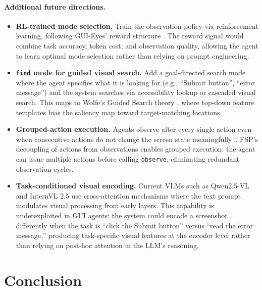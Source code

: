 \documentclass[11pt,a4paper]{article}
\begin{document}
\paragraph{Additional future directions.}

\begin{itemize}
    \item \textbf{RL-trained mode selection.} Train the observation policy via reinforcement learning, following GUI-Eyes' reward structure \cite{gui-eyes}. The reward signal would combine task accuracy, token cost, and observation quality, allowing the agent to learn optimal mode selection rather than relying on prompt engineering.

    \item \textbf{\texttt{find} mode for guided visual search.} Add a goal-directed search mode where the agent specifies what it is looking for (e.g., ``Submit button'', ``error message'') and the system searches via accessibility lookup or cascaded visual search. This maps to Wolfe's Guided Search theory \cite{wolfe-guided-search}, where top-down feature templates bias the saliency map toward target-matching locations.

    \item \textbf{Grouped-action execution.} Agents observe after every single action even when consecutive actions do not change the screen state meaningfully~\cite{osworld-human}. FSP's decoupling of actions from observations enables grouped execution: the agent can issue multiple actions before calling \texttt{observe}, eliminating redundant observation cycles.

    \item \textbf{Task-conditioned visual encoding.} Current VLMs such as Qwen2.5-VL \cite{qwen25-vl} and InternVL 2.5 \cite{internvl-25} use cross-attention mechanisms where the text prompt modulates visual processing from early layers. This capability is underexploited in GUI agents: the system could encode a screenshot differently when the task is ``click the Submit button'' versus ``read the error message,'' producing task-specific visual features at the encoder level rather than relying on post-hoc attention in the LLM's reasoning.
\end{itemize}



\section{Conclusion}
\label{sec:conclusion}
\end{document}
